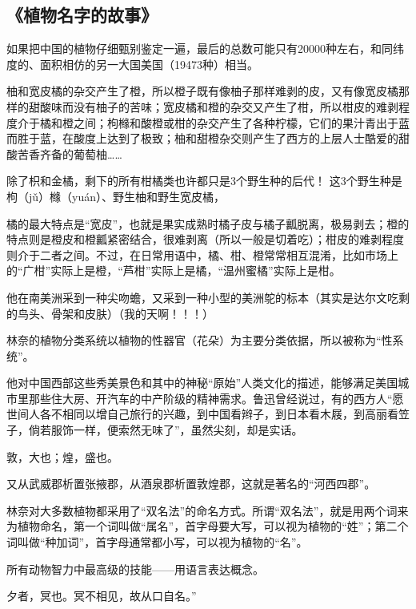 \subsection{《植物名字的故事》}
如果把中国的植物仔细甄别鉴定一遍，最后的总数可能只有20000种左右，和同纬度的、面积相仿的另一大国美国（19473种）相当。

柚和宽皮橘的杂交产生了橙，所以橙子既有像柚子那样难剥的皮，又有像宽皮橘那样的甜酸味而没有柚子的苦味；宽皮橘和橙的杂交又产生了柑，所以柑皮的难剥程度介于橘和橙之间；枸橼和酸橙或柑的杂交产生了各种柠檬，它们的果汁青出于蓝而胜于蓝，在酸度上达到了极致；柚和甜橙杂交则产生了西方的上层人士酷爱的甜酸苦香齐备的葡萄柚……

除了枳和金橘，剩下的所有柑橘类也许都只是3个野生种的后代！ 这3个野生种是枸（jǔ）橼（yuán）、野生柚和野生宽皮橘，

橘的最大特点是“宽皮”，也就是果实成熟时橘子皮与橘子瓤脱离，极易剥去；橙的特点则是橙皮和橙瓤紧密结合，很难剥离（所以一般是切着吃）；柑皮的难剥程度则介于二者之间。不过，在日常用语中，橘、柑、橙常常相互混淆，比如市场上的“广柑”实际上是橙，“芦柑”实际上是橘，“温州蜜橘”实际上是柑。

他在南美洲采到一种尖吻蟾，又采到一种小型的美洲鸵的标本（其实是达尔文吃剩的鸟头、骨架和皮肤）（我的天啊！！！）

林奈的植物分类系统以植物的性器官（花朵）为主要分类依据，所以被称为“性系统”。

他对中国西部这些秀美景色和其中的神秘“原始”人类文化的描述，能够满足美国城市里那些住大房、开汽车的中产阶级的精神需求。鲁迅曾经说过，有的西方人“愿世间人各不相同以增自己旅行的兴趣，到中国看辫子，到日本看木屐，到高丽看笠子，倘若服饰一样，便索然无味了”，虽然尖刻，却是实话。

敦，大也；煌，盛也。

又从武威郡析置张掖郡，从酒泉郡析置敦煌郡，这就是著名的“河西四郡”。

林奈对大多数植物都采用了“双名法”的命名方式。所谓“双名法”，就是用两个词来为植物命名，第一个词叫做“属名”，首字母要大写，可以视为植物的“姓”；第二个词叫做“种加词”，首字母通常都小写，可以视为植物的“名”。

所有动物智力中最高级的技能——用语言表达概念。

夕者，冥也。冥不相见，故从口自名。”